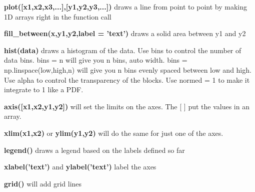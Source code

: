 \documentclass[11pt]{article}
\begin{document}
\textbf{plot({[}x1,x2,x3,...{]},{[}y1,y2,y3,...{]})} draws a line from
point to point by making 1D arrays right in the function call

\textbf{fill\_between(x,y1,y2,label = 'text')} draws a solid area
between y1 and y2

\textbf{hist(data)} draws a histogram of the data. Use bins to control
the number of data bins. bins = n will give you n bins, auto width. bins
= np.linspace(low,high,n) will give you n bins evenly spaced between low
and high. Use alpha to control the transparency of the blocks. Use
normed = 1 to make it integrate to 1 like a PDF.

\textbf{axis({[}x1,x2,y1,y2{]})} will set the limits on the axes. The
{[} {]} put the values in an array.

\textbf{xlim(x1,x2)} or \textbf{ylim(y1,y2)} will do the same for just
one of the axes.

\textbf{legend()} draws a legend based on the labels defined so far

\textbf{xlabel('text')} and \textbf{ylabel('text')} label the axes

\textbf{grid()} will add grid lines
\end{document}
